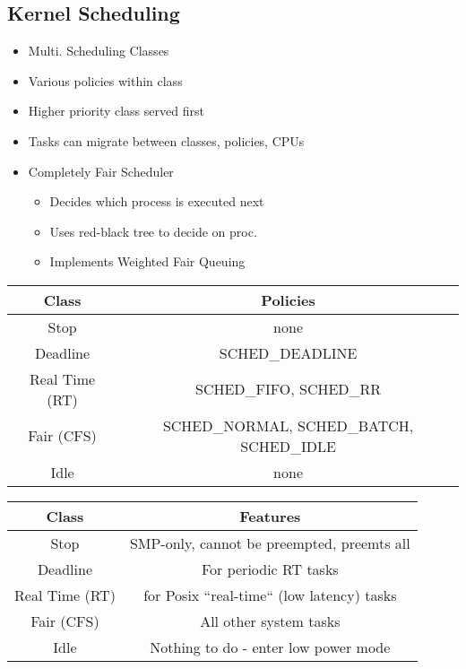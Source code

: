 \subsection{Kernel Scheduling}

\begin{itemize}
	\item Multi. Scheduling Classes
	\item Various policies within class
	\item Higher priority class served first
	\item Tasks can migrate between classes, policies, CPUs
	\item Completely Fair Scheduler
	\begin{itemize}
		\item Decides which process is executed next
		\item Uses red-black tree to decide on proc.
		\item Implements Weighted Fair Queuing
	\end{itemize}
\end{itemize}

\begin{table}[h]
	\centering
	\begin{tabular}{c|c}
		Class & Policies \\
		\hline
		Stop & none \\
		Deadline & SCHED\_DEADLINE \\
		Real Time (RT) & SCHED\_FIFO, SCHED\_RR \\
		Fair (CFS) & SCHED\_NORMAL, SCHED\_BATCH, SCHED\_IDLE \\
		Idle & none\\
	\end{tabular}
\end{table}

\begin{table}[h]
	\centering
	\begin{tabular}{c|c}
		Class & Features \\
		\hline
		Stop & SMP-only, cannot be preempted, preemts all \\
		Deadline & For periodic RT tasks \\
		Real Time (RT) & for Posix ``real-time`` (low latency) tasks \\
		Fair (CFS) & All other system tasks \\
		Idle & Nothing to do - enter low power mode \\
	\end{tabular}
\end{table}

